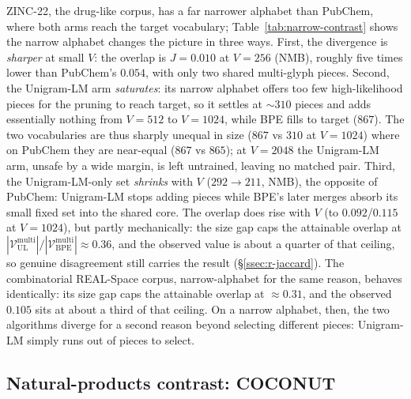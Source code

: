 \documentclass{article}
\begin{document}
ZINC-22, the drug-like corpus, has a far narrower alphabet than PubChem, where
both arms reach the target vocabulary; Table~\ref{tab:narrow-contrast} shows the
narrow alphabet changes the picture in three ways.
First, the divergence is \emph{sharper} at small $V$: the overlap is
$J{=}0.010$ at $V{=}256$ (NMB), roughly five times lower than PubChem's $0.054$,
with only two shared multi-glyph pieces. Second, the Unigram-LM arm
\emph{saturates}: its narrow alphabet offers too few high-likelihood pieces for
the pruning to reach target, so it settles at $\sim$$310$ pieces and adds
essentially nothing from $V{=}512$ to $V{=}1024$, while BPE fills to target
($867$). The two vocabularies are thus sharply unequal in size ($867$ vs $310$ at
$V{=}1024$) where on PubChem they are near-equal ($867$ vs $865$); at $V{=}2048$
the Unigram-LM arm, unsafe by a wide margin, is left untrained, leaving no matched
pair. Third, the Unigram-LM-only set \emph{shrinks} with $V$ ($292 \to 211$, NMB),
the opposite of PubChem: Unigram-LM stops adding pieces while BPE's later merges
absorb its small fixed set into the shared core. The overlap does rise with $V$
(to $0.092$/$0.115$ at $V{=}1024$), but partly mechanically: the size gap caps the
attainable overlap at
$|\mathcal{V}^{\mathrm{multi}}_{\mathrm{UL}}|/|\mathcal{V}^{\mathrm{multi}}_{\mathrm{BPE}}| \approx
0.36$, and the observed value is about a quarter of that ceiling, so genuine
disagreement still carries the result (\S\ref{ssec:r-jaccard}). The combinatorial
REAL-Space corpus, narrow-alphabet for the same reason, behaves identically: its
size gap caps the attainable overlap at $\approx 0.31$, and the observed $0.105$
sits at about a third of that ceiling. On a narrow alphabet, then, the two
algorithms diverge for a second reason beyond selecting different pieces:
Unigram-LM simply runs out of pieces to select.

\subsection{Natural-products contrast: COCONUT}\label{app:coconut}


\end{document}
